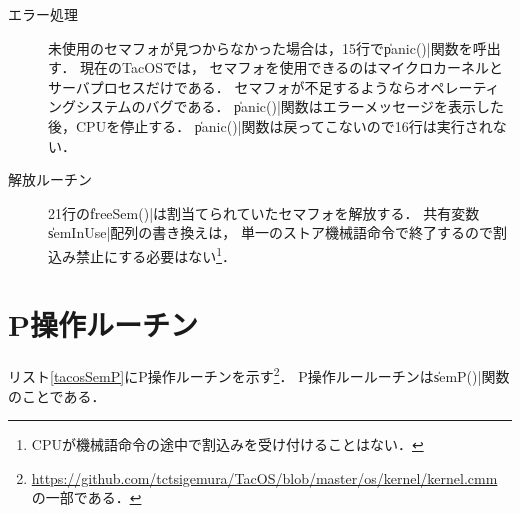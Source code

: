\begin{description}
\item [エラー処理]
  未使用のセマフォが見つからなかった場合は，15行で\|panic()|関数を呼出す．
  現在のTacOSでは，
  セマフォを使用できるのはマイクロカーネルとサーバプロセスだけである．
  セマフォが不足するようならオペレーティングシステムのバグである．
  \|panic()|関数はエラーメッセージを表示した後，CPUを停止する．
  \|panic()|関数は戻ってこないので16行は実行されない．

\item [解放ルーチン]
  21行の\|freeSem()|は割当てられていたセマフォを解放する．
  共有変数\|semInUse|配列の書き換えは，
  単一のストア機械語命令で終了するので割込み禁止にする必要はない\footnote{
    CPUが機械語命令の途中で割込みを受け付けることはない．}．
\end{description}

\section{P操作ルーチン}
リスト\ref{tacosSemP}にP操作ルーチンを示す\footnote{
  \url{https://github.com/tctsigemura/TacOS/blob/master/os/kernel/kernel.cmm}
  の一部である．}．
P操作ルールーチンは\|semP()|関数のことである．




